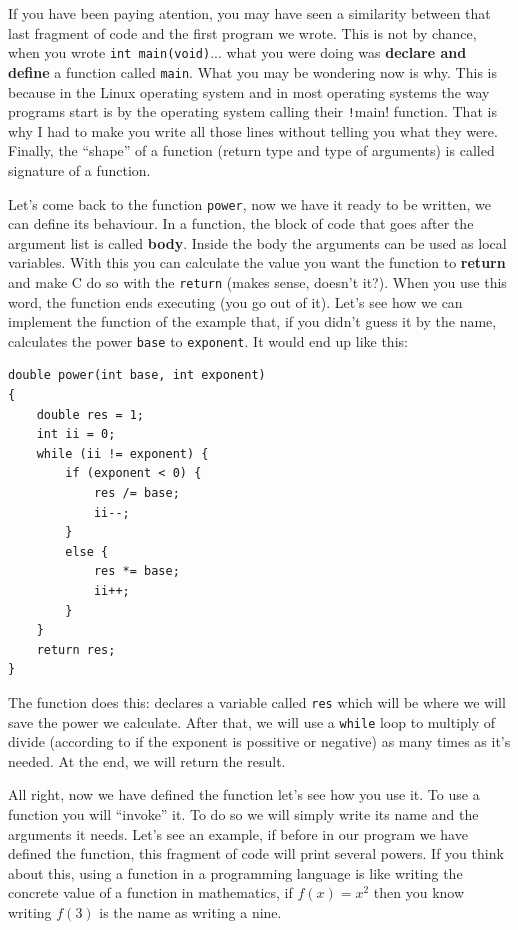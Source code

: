 \documentclass[a4paper]{article}
\begin{document}
If you have been paying atention, you may have seen a similarity between that
last fragment of code and the first program we wrote. This is not by chance,
when you wrote \verb!int main(void)!... what you were doing was \textbf{declare
and define} a function called \verb!main!. What you may be wondering now is why.
This is because in the Linux operating system and in most operating systems
the way programs start is by the operating system calling their \texttt!main!
function. That is why I had to make you write all those lines without telling
you what they were. Finally, the ``shape'' of a function (return type and
type of arguments) is called signature of a function.

Let's come back to the function \verb!power!, now we have it ready to be written,
we can define its behaviour. In a function, the block of code that goes after
the argument list is called \textbf{body}. Inside the body the arguments can
be used as local variables. With this you can calculate the value you want the
function to \textbf{return} and make C do so with the
\lstinline[style=C]{return} (makes sense, doesn't it?). When you use this word,
the function ends executing (you go out of it). Let's see how we can implement
the function of the example that, if you didn't guess it by the name, calculates
the power \verb!base! to \verb!exponent!. It would end up like this:

\noindent
\begin{minipage}[H]{\linewidth}
\mbox{}
\begin{lstlisting}[style=C, label={lst:functionExample},
caption={Example of a function in C}]
double power(int base, int exponent)
{
    double res = 1;
    int ii = 0;
    while (ii != exponent) {
        if (exponent < 0) {
            res /= base;
            ii--;
        }
        else {
            res *= base;
            ii++;
        }
    }
    return res;
}
\end{lstlisting}
\end{minipage}

The function does this: declares a variable called \verb!res! which will be
where we will save the power we calculate. After that, we will use a
\verb!while! loop to multiply of divide (according to if the exponent is
possitive or negative) as many times as it's needed. At the end, we will return
the result.

All right, now we have defined the function let's see how you use it. To use
a function you will ``invoke'' it. To do so we will simply write its name and
the arguments it needs. Let's see an example, if before in our program we
have defined the function, this fragment of code will print several powers.
If you think about this, using a function in a programming language is like
writing the concrete value of a function in mathematics, if $f(x) = x^2$
then you know writing $f(3)$ is the name as writing a nine.
\end{document}
